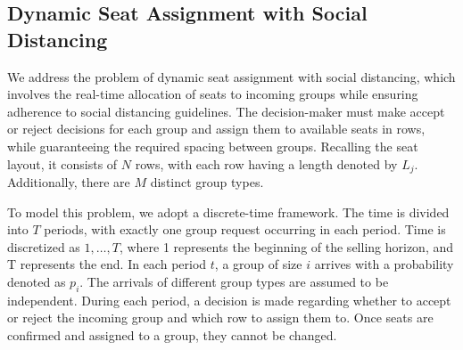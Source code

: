 




\subsection{Dynamic Seat Assignment with Social Distancing}\label{sec_dynamic}
We address the problem of dynamic seat assignment with social distancing, which involves the real-time allocation of seats to incoming groups while ensuring adherence to social distancing guidelines. The decision-maker must make accept or reject decisions for each group and assign them to available seats in rows, while guaranteeing the required spacing between groups. Recalling the seat layout, it consists of $N$ rows, with each row having a length denoted by $L_j$. Additionally, there are $M$ distinct group types.

To model this problem, we adopt a discrete-time framework. The time is divided into $T$ periods, with exactly one group request occurring in each period. Time is discretized as $1, \ldots, T$, where 1 represents the beginning of the selling horizon, and T represents the end. In each period $t$, a group of size $i$ arrives with a probability denoted as $p_i$. The arrivals of different group types are assumed to be independent. During each period, a decision is made regarding whether to accept or reject the incoming group and which row to assign them to. Once seats are confirmed and assigned to a group, they cannot be changed.

